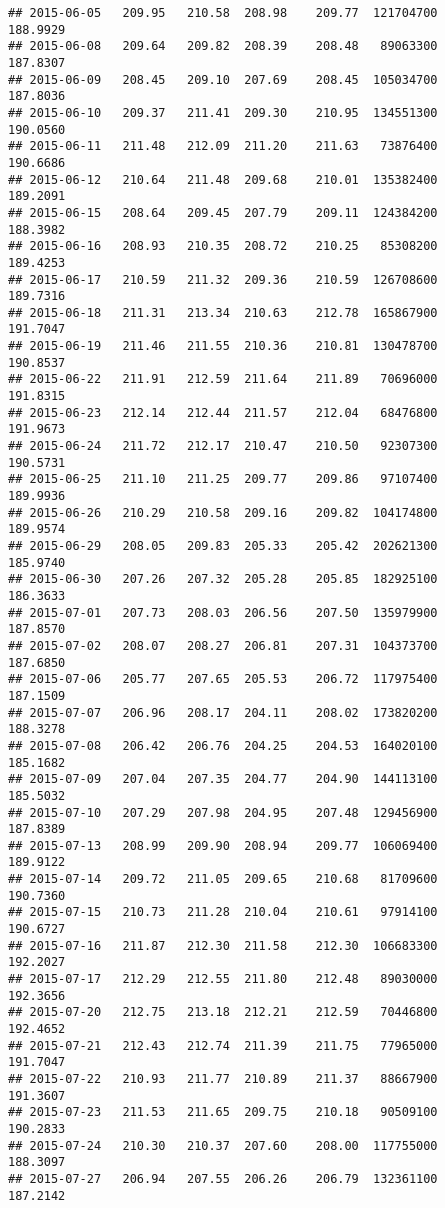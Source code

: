 \documentclass[
]{article}
\begin{document}
\begin{verbatim}
## 2015-06-05   209.95   210.58  208.98    209.77  121704700     188.9929
## 2015-06-08   209.64   209.82  208.39    208.48   89063300     187.8307
## 2015-06-09   208.45   209.10  207.69    208.45  105034700     187.8036
## 2015-06-10   209.37   211.41  209.30    210.95  134551300     190.0560
## 2015-06-11   211.48   212.09  211.20    211.63   73876400     190.6686
## 2015-06-12   210.64   211.48  209.68    210.01  135382400     189.2091
## 2015-06-15   208.64   209.45  207.79    209.11  124384200     188.3982
## 2015-06-16   208.93   210.35  208.72    210.25   85308200     189.4253
## 2015-06-17   210.59   211.32  209.36    210.59  126708600     189.7316
## 2015-06-18   211.31   213.34  210.63    212.78  165867900     191.7047
## 2015-06-19   211.46   211.55  210.36    210.81  130478700     190.8537
## 2015-06-22   211.91   212.59  211.64    211.89   70696000     191.8315
## 2015-06-23   212.14   212.44  211.57    212.04   68476800     191.9673
## 2015-06-24   211.72   212.17  210.47    210.50   92307300     190.5731
## 2015-06-25   211.10   211.25  209.77    209.86   97107400     189.9936
## 2015-06-26   210.29   210.58  209.16    209.82  104174800     189.9574
## 2015-06-29   208.05   209.83  205.33    205.42  202621300     185.9740
## 2015-06-30   207.26   207.32  205.28    205.85  182925100     186.3633
## 2015-07-01   207.73   208.03  206.56    207.50  135979900     187.8570
## 2015-07-02   208.07   208.27  206.81    207.31  104373700     187.6850
## 2015-07-06   205.77   207.65  205.53    206.72  117975400     187.1509
## 2015-07-07   206.96   208.17  204.11    208.02  173820200     188.3278
## 2015-07-08   206.42   206.76  204.25    204.53  164020100     185.1682
## 2015-07-09   207.04   207.35  204.77    204.90  144113100     185.5032
## 2015-07-10   207.29   207.98  204.95    207.48  129456900     187.8389
## 2015-07-13   208.99   209.90  208.94    209.77  106069400     189.9122
## 2015-07-14   209.72   211.05  209.65    210.68   81709600     190.7360
## 2015-07-15   210.73   211.28  210.04    210.61   97914100     190.6727
## 2015-07-16   211.87   212.30  211.58    212.30  106683300     192.2027
## 2015-07-17   212.29   212.55  211.80    212.48   89030000     192.3656
## 2015-07-20   212.75   213.18  212.21    212.59   70446800     192.4652
## 2015-07-21   212.43   212.74  211.39    211.75   77965000     191.7047
## 2015-07-22   210.93   211.77  210.89    211.37   88667900     191.3607
## 2015-07-23   211.53   211.65  209.75    210.18   90509100     190.2833
## 2015-07-24   210.30   210.37  207.60    208.00  117755000     188.3097
## 2015-07-27   206.94   207.55  206.26    206.79  132361100     187.2142

\end{verbatim}
\end{document}
